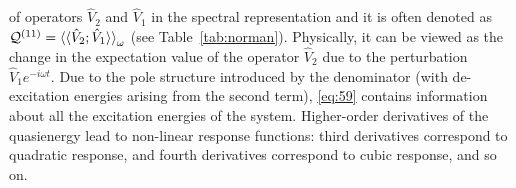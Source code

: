\documentclass[%
class = book,%
crop = false,%
float = true,%
multi = true,%
preview = false,%
]{standalone}
\begin{document}
of operators \(\hat{V}_{2}\) and \(\hat{V}_{1}\) in the spectral representation and it is often denoted as \(\mathcal{Q}^{(11)} = \braket{\braket{\hat{V}_{2};\hat{V}_{1}}}_{\omega}\) (see Table~\ref{tab:norman}). Physically, it can be viewed as the change in the expectation value of the operator \(\hat{V}_{2}\) due to the perturbation \(\hat{V}_{1}e^{-i\omega t}\). Due to the pole structure introduced by the denominator (with de-excitation energies arising from the second term), \eqref{eq:59} contains information about all the excitation energies of the system. Higher-order derivatives of the quasienergy lead to non-linear response functions: third derivatives correspond to quadratic response, and fourth derivatives correspond to cubic response, and so on.

\onlyifstandalone{\printbibliography}
\end{document}
